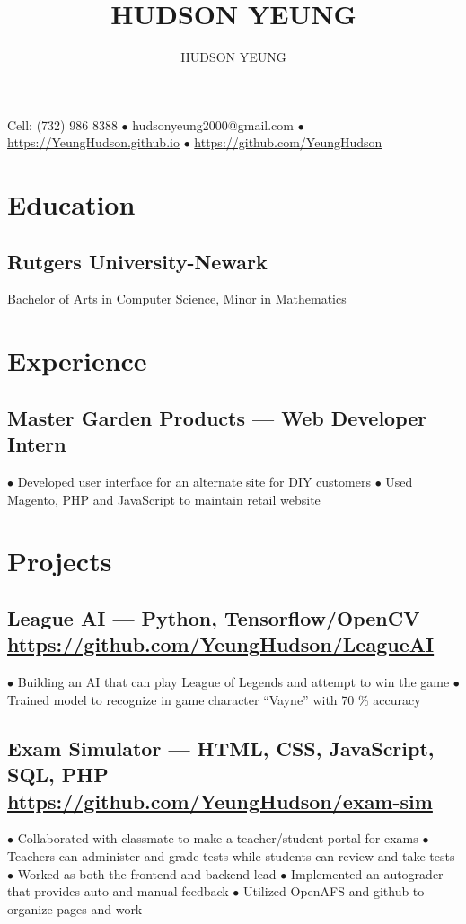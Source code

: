 \documentclass{article}
\makeatletter
\newcommand\bulletpts{$\bullet$}
\newcommand\bulletspace{\hspace*{.5em}}
\renewcommand{\maketitle}{
\begin{center}
{\huge\bfseries
\theauthor}

\vspace{.15em}

  Cell: (732) 986 8388 $\bullet$ hudsonyeung2000@gmail.com $\bullet$ \url{https://YeungHudson.github.io} $\bullet$ \url{https://github.com/YeungHudson}
\end{center}
}
\makeatother
\begin{document}
\title{HUDSON YEUNG}
\author{HUDSON YEUNG}
\maketitle

\section{Education}
\subsection{Rutgers University-Newark}
Bachelor of Arts in Computer Science, Minor in Mathematics \hfill{}\par

\section{Experience}
\subsection{Master Garden Products --- Web Developer Intern \hfill{}}
\bulletspace{}\bulletpts{} Developed user interface for an alternate site for DIY customers \newline
\bulletspace{}\bulletpts{} Used Magento, PHP and JavaScript to maintain retail website

\section{Projects}
\subsection{League AI --- Python, Tensorflow/OpenCV \hfill{}\newline\small\url{https://github.com/YeungHudson/LeagueAI}}
\bulletspace{}\bulletpts{} Building an AI that can play League of Legends and attempt to win the game \newline
\bulletspace{}\bulletpts{} Trained model to recognize in game character ``Vayne'' with 70 \% accuracy
\subsection{Exam Simulator --- HTML, CSS, JavaScript, SQL, PHP \hfill{}\newline\small\url{https://github.com/YeungHudson/exam-sim}}
\bulletspace\bulletpts{} Collaborated with classmate to make a teacher/student portal for exams \newline 
\bulletspace\bulletpts{} Teachers can administer and grade tests while students can review and take tests \newline
\bulletspace\bulletpts{} Worked as both the frontend and backend lead \newline
\bulletspace\bulletpts{} Implemented an autograder that provides auto and manual feedback \newline
\bulletspace\bulletpts{} Utilized OpenAFS and github to organize pages and work
\end{document}
